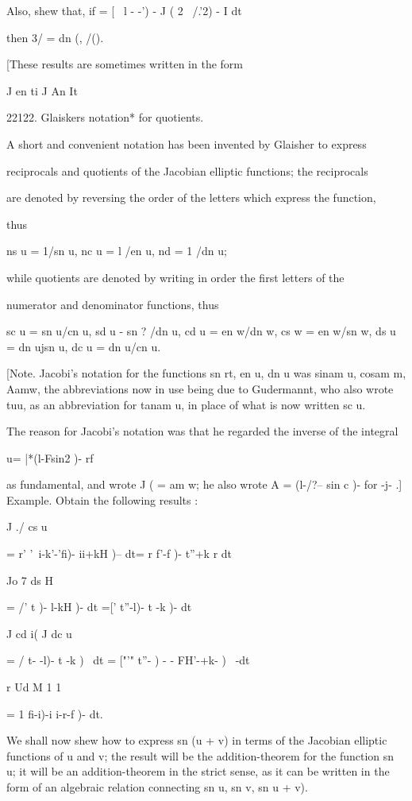 %
%

Also, shew that, if = [ \ l - -') - J ( 2 \ /.'2) - I dt

then 3/ = dn (, /().

[These results are sometimes written in the form

J en ti J An It

22122. Glaiskers notation* for quotients.

A short and convenient notation has been invented by Glaisher to
express

reciprocals and quotients of the Jacobian elliptic functions; the
reciprocals

are denoted by reversing the order of the letters which express the
function,

thus

ns u = 1/sn u, nc u = l /en u, nd = 1 /dn u;

while quotients are denoted by writing in order the first letters of
the

numerator and denominator functions, thus

sc u = sn u/cn u, sd u - sn ? /dn u, cd u = en w/dn w, cs w = en w/sn
w, ds u = dn ujsn u, dc u = dn u/cn u.

[Note. Jacobi's notation for the functions sn rt, en u, dn u was sinam
u, cosam m, Aamw, the abbreviations now in use being due to
Gudermannt, who also wrote tuu, as an abbreviation for tanam u, in
place of what is now written sc u.

The reason for Jacobi's notation was that he regarded the inverse of
the integral

u= |*(l-Fsin2 )- rf

as fundamental, and wrote J ( = am w; he also wrote A = (l-/?-- sin c
)- for -j- .] Example. Obtain the following results :

J ./ cs u

= r' '\ i-k'-'fi)- ii+kH )-- dt= r f'-f )- t''+k r dt

Jo 7 ds H

= /' t )- l-kH )- dt =[' t''-l)- t -k )- dt

J cd i( J dc u

= / t- -l)- t -k )~ dt = ["'" t''- ) - - FH'-+k- )~ -dt

r Ud M 1 1

= 1 fi-i)-i i-r-f )- dt.


We shall now shew how to express sn (u + v) in terms of the Jacobian
elliptic functions of u and v; the result will be the
addition-theorem for the function sn u; it will be an
addition-theorem in the strict sense, as it can be written in the form
of an algebraic relation connecting sn u, sn v, sn u + v).

